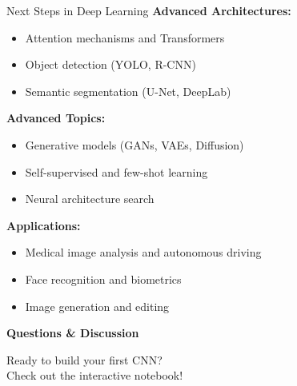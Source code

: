 \documentclass[aspectratio=169,10pt]{beamer}
\begin{document}
\begin{frame}{Next Steps in Deep Learning}
\textbf{Advanced Architectures:}
\begin{itemize}
\item Attention mechanisms and Transformers
\item Object detection (YOLO, R-CNN)
\item Semantic segmentation (U-Net, DeepLab)
\end{itemize}

\textbf{Advanced Topics:}
\begin{itemize}
\item Generative models (GANs, VAEs, Diffusion)
\item Self-supervised and few-shot learning
\item Neural architecture search
\end{itemize}

\textbf{Applications:}
\begin{itemize}
\item Medical image analysis and autonomous driving
\item Face recognition and biometrics
\item Image generation and editing
\end{itemize}
\end{frame}

\begin{frame}[standout]
\Large
\textbf{Questions \& Discussion}

\vspace{1cm}
\normalsize
Ready to build your first CNN?\\
Check out the interactive notebook!
\end{frame}
\end{document}
